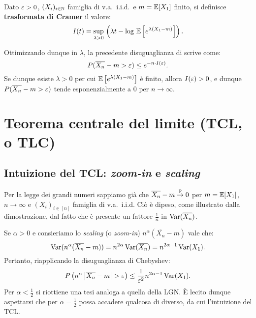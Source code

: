 \begin{multicols*}{2}
\begin{definition}
    Dato $\varepsilon > 0$, $(X_i)_{i \in \mathbb{N}}$ famiglia
di v.a.~i.i.d.~e $m = \mathbb{E}[X_1]$ finito, si definisce \textbf{trasformata di Cramer}
    il valore:
    \[
        I(t) = \sup_{\lambda > 0} \, \left(\lambda t - \log \, \mathbb{E}\left[e^{\lambda(X_1-m)}\right]\right).
    \]
\end{definition}

Ottimizzando dunque in $\lambda$, la precedente disuguaglianza di scrive come:
\[
    P(\overline{X_n} - m > \varepsilon) \leq e^{-n \cdot I(\varepsilon)}.
\]
Se dunque esiste $\lambda > 0$ per cui $\mathbb{E}\left[e^{\lambda(X_1-m)}\right]$ è finito, allora $I(\varepsilon) > 0$, e dunque $P(\overline{X_n} - m > \varepsilon)$ tende esponenzialmente a $0$
per $n \to \infty$.

\section{Teorema centrale del limite (TCL, o TLC)}

\subsection{Intuizione del TCL: \textit{zoom-in} e \textit{scaling}}
Per la legge dei grandi numeri sappiamo già che
$\overline{X_n} - m \overset{\mathbb{P}}{\to} 0$ per $m = \mathbb{E}[X_1]$, $n \to \infty$ e
$(X_i)_{i \in [n]}$ famiglia di v.a.~i.i.d. Ciò è dipeso, come illustrato dalla dimostrazione, dal fatto che è presente un fattore $\frac{1}{n}$ in $\operatorname{Var}(\overline{X_n})$.
\smallskip


Se $\alpha > 0$ e consieriamo lo \textit{scaling} (o \textit{zoom-in}) $n^\alpha (\overline{X_n} - m)$
vale che:
\[
    \operatorname{Var}(n^\alpha (\overline{X_n} - m)) = n^{2\alpha} \operatorname{Var}(\overline{X_n}) = n^{2\alpha - 1} \operatorname{Var}(X_1). 
\]
Pertanto, riapplicando la disuguaglianza di Chebyshev:
\[
    P\left(n^\alpha \left\lvert \overline{X_n} - m \right\rvert > \varepsilon\right) \leq \frac{1}{\varepsilon^2} n^{2\alpha - 1} \operatorname{Var}(X_1).
\]
Per $\alpha < \frac{1}{2}$ si riottiene una tesi analoga a quella della LGN. È
lecito dunque aspettarsi che per $\alpha = \frac{1}{2}$ possa accadere qualcosa
di diverso, da cui l'intuizione del TCL.


\end{multicols*}
